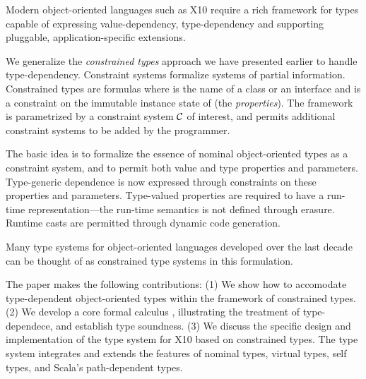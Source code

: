 Modern object-oriented languages such as X10 require a rich framework for types
capable of expressing value-dependency, type-dependency and supporting
pluggable, application-specific extensions.

We generalize the {\em constrained types} approach we have presented
earlier to handle type-dependency.  Constraint systems formalize
systems of partial information.  Constrained types are formulas
 where  is the name of a class or an interface and
 is a constraint on the immutable instance state of 
 (the {\em properties}). The framework is parametrized by 
a constraint system $\cal C$ of interest, and permits additional
constraint systems to be added by the programmer.

The basic idea is to formalize the essence of nominal object-oriented
types as a constraint system, and to permit both value and type
properties and parameters.  Type-generic dependence is now expressed
through constraints on these properties and parameters.  Type-valued
properties are required to have a run-time representation---the
run-time semantics is not defined through erasure. Runtime casts are
permitted through dynamic code generation.

Many type systems for object-oriented languages developed over the
last decade can be thought of as constrained type systems in this
formulation.

The paper makes the following contributions: (1) We show how to
accomodate type-dependent object-oriented types within the framework
of constrained types. (2) We develop a core formal calculus \gxx,
illustrating the treatment of type-dependece, and establish type
soundness.  (3) We discuss the specific design and implementation of
the type system for X10 based on constrained types.  The type system
integrates and extends the features of nominal types, virtual types,
self types, and Scala's path-dependent types.

